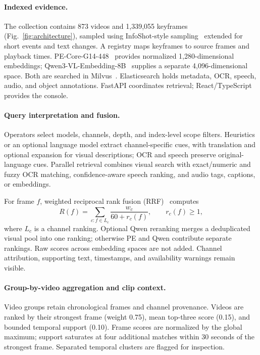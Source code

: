 \documentclass[runningheads]{llncs}
\begin{document}
\paragraph{Indexed evidence.}
The collection contains 873 videos and 1,339,055 keyframes
(Fig.~\ref{fig:architecture}), sampled using InfoShot-style sampling~\cite{infoshot2026}
extended for short events and text changes. A registry maps keyframes to source frames and playback times.
PE-Core-G14-448~\cite{pe2025} provides normalized 1,280-dimensional embeddings;
Qwen3-VL-Embedding-8B~\cite{qwen2026} supplies a separate 4,096-dimensional space.
Both are searched in Milvus~\cite{milvus2021}. Elasticsearch holds metadata, OCR, speech, audio, and object annotations.
FastAPI coordinates retrieval; React/TypeScript provides the console.

\paragraph{Query interpretation and fusion.}
Operators select models, channels, depth, and index-level scope filters.
Heuristics or an optional language model extract channel-specific cues, with
translation and optional expansion for visual descriptions; OCR and speech
preserve original-language cues. Parallel retrieval combines
visual search with exact/numeric and fuzzy OCR matching, confidence-aware speech
ranking, and audio tags, captions, or embeddings.

For frame $f$, weighted reciprocal rank fusion (RRF)~\cite{rrf2009} computes
\begin{equation}
 R(f)=\sum_{c:f\in L_c}\frac{w_c}{60+r_c(f)},\qquad r_c(f)\geq1,
 \label{eq:rrf}
\end{equation}
where $L_c$ is a channel ranking. Optional Qwen reranking merges a deduplicated visual pool into one ranking;
otherwise PE and Qwen contribute separate rankings. Raw scores across embedding
spaces are not added. Channel attribution, supporting text, timestamps, and availability warnings
remain visible.

\paragraph{Group-by-video aggregation and clip context.}
Video groups retain chronological frames and channel provenance. Videos are ranked by their strongest frame (weight 0.75),
mean top-three score (0.15), and bounded temporal support (0.10). Frame scores
are normalized by the global maximum; support saturates at four additional
matches within 30 seconds of the strongest frame. Separated temporal clusters
are flagged for inspection.
\end{document}
